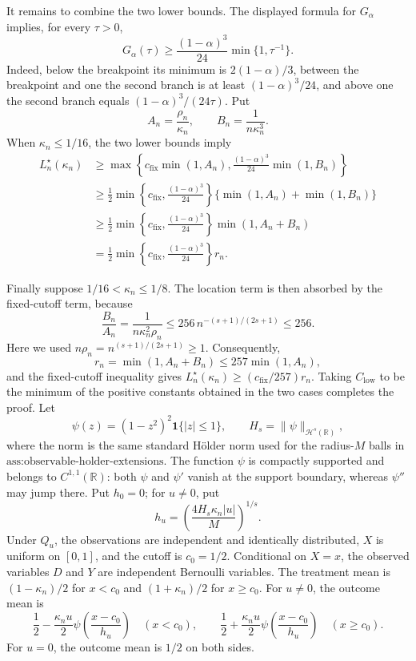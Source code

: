 It remains to combine the two lower bounds.  The displayed formula for
\(G_\alpha\) implies, for every \(\tau>0\),
\[
 G_\alpha(\tau)
 \ge \frac{(1-\alpha)^3}{24}\min\{1,\tau^{-1}\}.
\]
Indeed, below the breakpoint its minimum is
\(2(1-\alpha)/3\), between the breakpoint and one the second branch is
at least \((1-\alpha)^3/24\), and above one the second branch equals
\((1-\alpha)^3/(24\tau)\).  Put
\[
 A_n=\frac{\rho_n}{\kappa_n},
 \qquad B_n=\frac1{n\kappa_n^3}.
\]
When \(\kappa_n\le1/16\), the two lower bounds imply
\[
 \begin{aligned}
 L_n^\star(\kappa_n)
 &\ge \max\left\{
 c_{\mathrm{fix}}\min(1,A_n),
 \frac{(1-\alpha)^3}{24}\min(1,B_n)\right\}\\
 &\ge \frac12\min\left\{c_{\mathrm{fix}},
 \frac{(1-\alpha)^3}{24}\right\}
 \{\min(1,A_n)+\min(1,B_n)\}\\
 &\ge \frac12\min\left\{c_{\mathrm{fix}},
 \frac{(1-\alpha)^3}{24}\right\}
 \min(1,A_n+B_n)\\
 &=\frac12\min\left\{c_{\mathrm{fix}},
 \frac{(1-\alpha)^3}{24}\right\}r_n.
 \end{aligned}
\]

Finally suppose \(1/16<\kappa_n\le1/8\).  The location term is then
absorbed by the fixed-cutoff term, because
\[
 \frac{B_n}{A_n}
 =\frac1{n\kappa_n^2\rho_n}
 \le256\,n^{-(s+1)/(2s+1)}
 \le256.
\]
Here we used \(n\rho_n=n^{(s+1)/(2s+1)}\ge1\).  Consequently,
\[
 r_n=\min(1,A_n+B_n)
 \le257\min(1,A_n),
\]
and the fixed-cutoff inequality gives
\(L_n^\star(\kappa_n)\ge(c_{\mathrm{fix}}/257)r_n\).
Taking \(C_{\mathrm{low}}\) to be the minimum of the positive constants
obtained in the two cases completes the proof.
Let
\[
 \psi(z)=(1-z^2)^2\mathbf 1\{|z|\le1\},
 \qquad H_s=\|\psi\|_{\mathcal H^s(\mathbb R)},
\]
where the norm is the same standard H\"older norm used for the
radius-\(M\) balls in \(\text{ass:observable-holder-extensions}\).
The function \(\psi\) is compactly supported and belongs to
\(C^{1,1}(\mathbb R)\): both \(\psi\) and \(\psi'\) vanish at the
support boundary, whereas \(\psi''\) may jump there.  Put \(h_0=0\);
for \(u\ne0\), put
\[
 h_u=\left(\frac{4H_s\kappa_n|u|}{M}\right)^{1/s}.
\]
Under \(Q_u\), the observations are independent and identically
distributed, \(X\) is uniform on \([0,1]\), and the cutoff is
\(c_0=1/2\).  Conditional on \(X=x\), the observed variables \(D\) and
\(Y\) are independent Bernoulli variables.  The treatment mean is
\((1-\kappa_n)/2\) for \(x<c_0\) and \((1+\kappa_n)/2\) for
\(x\ge c_0\).  For \(u\ne0\), the outcome mean is
\[
 \frac12-\frac{\kappa_nu}{2}
 \psi\!\left(\frac{x-c_0}{h_u}\right)\quad(x<c_0),
 \qquad
 \frac12+\frac{\kappa_nu}{2}
 \psi\!\left(\frac{x-c_0}{h_u}\right)\quad(x\ge c_0).
\]
For \(u=0\), the outcome mean is \(1/2\) on both sides.

